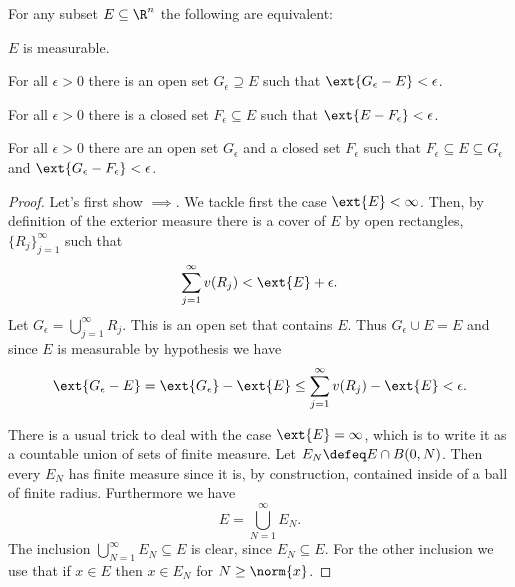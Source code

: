 \documentclass[12pt,oneside]{book}
\begin{document}
{\def\currentprefix{theo:characterization of measurable sets}
\begin{theorem}\label{theo:characterization of measurable sets}
	For any subset \( E \subseteq \R^n \) the following are equivalent:
	\begin{points}
	\item {} \( E \) is measurable.
	\item {} For all \( \epsilon > 0 \) there is an open set \( G_{\epsilon} \supseteq E \) such that \(  \ext{G_{\epsilon} - E} < \epsilon \).
	\item {} For all \( \epsilon > 0 \) there is a closed set \( F_{\epsilon} \subseteq E \) such that \(  \ext{E - F_{\epsilon}} < \epsilon \).
	\item {} For all \( \epsilon > 0 \) there are an open set \( G_{\epsilon} \) and a closed set \( F_{\epsilon} \) such that \( F_{\epsilon} \subseteq E \subseteq G_{\epsilon} \) and \( \ext{G_{\epsilon} - F_{\epsilon}} < \epsilon \).
	\end{points}
\end{theorem}
\begin{proof}
	Let's first show \( \implies \). We tackle first the case \(
	\ext{E} < \infty \). Then, by definition of the exterior measure there is a cover of \( E \) by open rectangles, \( \{ R_j \}_{j = 1}^\infty \) such that
	\begin{equation*}
		\sum_{j = 1}^{\infty} v(R_j) < \ext{E} + \epsilon.
	\end{equation*}
	Let \( G_\epsilon = \bigcup_{j = 1}^\infty R_j \). This is an open set that contains \(
	E \). Thus \( G_\epsilon \cup E = E \) and since \( E \) is measurable by hypothesis we
	have
	\begin{equation*}
		\ext{G_\epsilon - E} = \ext{G_\epsilon} - \ext{E} \leq \sum_{j = 1}^{\infty}v(R_j) - \ext{E} < \epsilon.
	\end{equation*}

	There is a usual trick to deal with the case \( \ext{E} = \infty \), which is to write
	it as a countable union of sets of finite measure. Let \( E_N \defeq E
	\cap B(0,N) \). Then every \( E_N \) has finite measure since it is, by construction,
	contained inside of a	ball of finite radius. Furthermore we have
	\begin{equation*}
		E = \bigcup_{N = 1}^{\infty} E_N.
	\end{equation*}
	The inclusion \( \bigcup_{N = 1}^\infty E_N \subseteq E \) is clear, since \( E_N
	\subseteq E \). For the other inclusion we use that if \( x \in E \) then \( x \in E_N
	\) for \( N \geq \norm{x} \).


\end{proof}}
\end{document}
